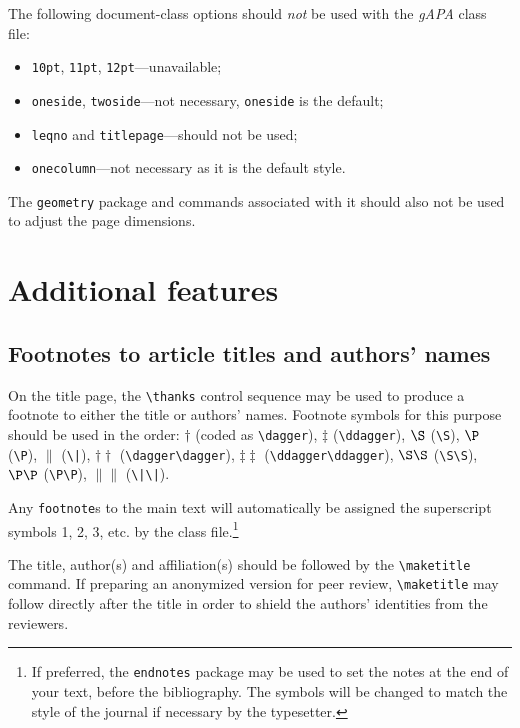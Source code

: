\documentclass{gAPA2e}
\theoremstyle{plain}
\theoremstyle{remark}
\theoremstyle{definition}
\begin{document}
The following document-class options should {\em not\/} be used with the {\it gAPA} class file:
%
\begin{itemize}
   \item {\tt 10pt}, {\tt 11pt}, {\tt 12pt}---unavailable;
   \item {\tt oneside}, {\tt twoside}---not necessary, \texttt{oneside} is the default;
   \item {\tt leqno} and {\tt titlepage}---should not be used;
   \item {\tt onecolumn}---not necessary as it is the default style.
\end{itemize}
%
The \texttt{geometry} package and commands associated with it should also not be used to adjust the page dimensions.


\section{Additional features}

\subsection{Footnotes to article titles and authors' names}

On the title page, the \verb"\thanks" control sequence may be used to produce a footnote to either the title or authors' names.
Footnote symbols for this purpose should be used in the order: $\dagger$ (coded as \verb"\dagger"),
$\ddagger$ (\verb"\ddagger"), $\S$ (\verb"\S"), $\P$ (\verb"\P"), $\|$ (\verb"\|"),\break
$\dagger\dagger$ (\verb"\dagger\dagger"), $\ddagger\ddagger$ (\verb"\ddagger\ddagger"), $\S\S$ (\verb"\S\S"), $\P\P$ (\verb"\P\P"), $\|\|$ (\verb"\|\|").

Any \verb"footnote"s to the main text will automatically be assigned the superscript
 symbols 1, 2, 3, etc. by the class file.\footnote{If preferred, the \texttt{endnotes} package
 may be used to set the notes at the end of your text, before the bibliography.
 The symbols will be changed to match the style of the journal if necessary by the typesetter.}

The title, author(s) and affiliation(s) should be followed by the {\verb"\maketitle"} command. If preparing an anonymized version for peer review, {\verb"\maketitle"} may follow directly after the title in order to shield the authors' identities from the reviewers.
\end{document}
